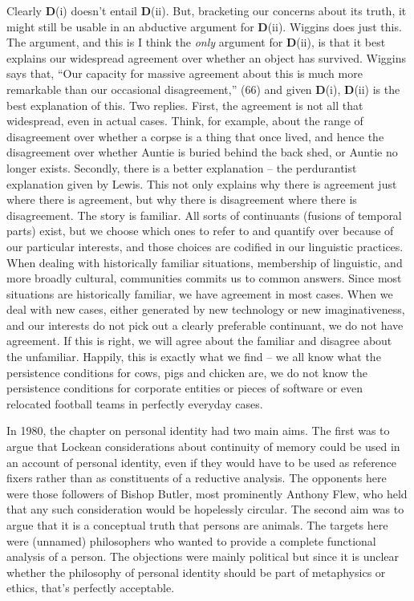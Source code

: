\documentclass[
  11pt,
  letterpaper,
  DIV=11,
  numbers=noendperiod,
  twoside]{scrartcl}
\begin{document}
Clearly \textbf{D}(i) doesn't entail \textbf{D}(ii). But, bracketing our
concerns about its truth, it might still be usable in an abductive
argument for \textbf{D}(ii). Wiggins does just this. The argument, and
this is I think the \emph{only} argument for \textbf{D}(ii), is that it
best explains our widespread agreement over whether an object has
survived. Wiggins says that, ``Our capacity for massive agreement about
this is much more remarkable than our occasional disagreement,'' (66)
and given \textbf{D}(i), \textbf{D}(ii) is the best explanation of this.
Two replies. First, the agreement is not all that widespread, even in
actual cases. Think, for example, about the range of disagreement over
whether a corpse is a thing that once lived, and hence the disagreement
over whether Auntie is buried behind the back shed, or Auntie no longer
exists. Secondly, there is a better explanation -- the perdurantist
explanation given by Lewis. This not only explains why there is
agreement just where there is agreement, but why there is disagreement
where there is disagreement. The story is familiar. All sorts of
continuants (fusions of temporal parts) exist, but we choose which ones
to refer to and quantify over because of our particular interests, and
those choices are codified in our linguistic practices. When dealing
with historically familiar situations, membership of linguistic, and
more broadly cultural, communities commits us to common answers. Since
most situations are historically familiar, we have agreement in most
cases. When we deal with new cases, either generated by new technology
or new imaginativeness, and our interests do not pick out a clearly
preferable continuant, we do not have agreement. If this is right, we
will agree about the familiar and disagree about the unfamiliar.
Happily, this is exactly what we find -- we all know what the
persistence conditions for cows, pigs and chicken are, we do not know
the persistence conditions for corporate entities or pieces of software
or even relocated football teams in perfectly everyday cases.

In 1980, the chapter on personal identity had two main aims. The first
was to argue that Lockean considerations about continuity of memory
could be used in an account of personal identity, even if they would
have to be used as reference fixers rather than as constituents of a
reductive analysis. The opponents here were those followers of Bishop
Butler, most prominently Anthony Flew, who held that any such
consideration would be hopelessly circular. The second aim was to argue
that it is a conceptual truth that persons are animals. The targets here
were (unnamed) philosophers who wanted to provide a complete functional
analysis of a person. The objections were mainly political but since it
is unclear whether the philosophy of personal identity should be part of
metaphysics or ethics, that's perfectly acceptable.
\end{document}
